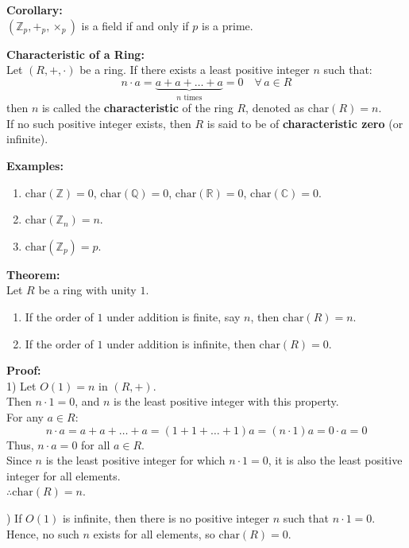 \documentclass[11pt]{article}
\begin{document}
\bigskip
\noindent \textbf{Corollary:} \\
$(\mathbb{Z}_p, +_p, \times_p)$ is a field if and only if $p$ is a prime.

\newpage
\noindent \textbf{Characteristic of a Ring:} \\
Let $(R, +, \cdot)$ be a ring. If there exists a least positive integer $n$ such that:
\[
n \cdot a = \underbrace{a + a + \dots + a}_{n \text{ times}} = 0 \quad \forall\, a \in R
\]
then $n$ is called the \textbf{characteristic} of the ring $R$, denoted as $\text{char}(R) = n$. \\
If no such positive integer exists, then $R$ is said to be of \textbf{characteristic zero} (or infinite).

\bigskip
\noindent \textbf{Examples:}
\begin{enumerate}
    \item $\text{char}(\mathbb{Z}) = 0$, $\text{char}(\mathbb{Q}) = 0$, $\text{char}(\mathbb{R}) = 0$, $\text{char}(\mathbb{C}) = 0$.
    \item $\text{char}(\mathbb{Z}_n) = n$.
    \item $\text{char}(\mathbb{Z}_p) = p$.
\end{enumerate}

\bigskip
\noindent \textbf{Theorem:} \\
Let $R$ be a ring with unity $1$.
\begin{enumerate}
    \item If the order of $1$ under addition is finite, say $n$, then $\text{char}(R) = n$.
    \item If the order of $1$ under addition is infinite, then $\text{char}(R) = 0$.
\end{enumerate}

\medskip
\noindent \textbf{Proof:} \\
1) Let $O(1) = n$ in $(R, +)$. \\
Then $n \cdot 1 = 0$, and $n$ is the least positive integer with this property. \\
For any $a \in R$:
\[
n \cdot a = a + a + \dots + a = (1 + 1 + \dots + 1)a = (n \cdot 1)a = 0 \cdot a = 0
\]
Thus, $n \cdot a = 0$ for all $a \in R$. \\
Since $n$ is the least positive integer for which $n \cdot 1 = 0$, it is also the least positive integer for all elements. \\
$\therefore \text{char}(R) = n$.

\medskip
{}) If $O(1)$ is infinite, then there is no positive integer $n$ such that $n \cdot 1 = 0$. \\
Hence, no such $n$ exists for all elements, so $\text{char}(R) = 0$.
\end{document}
